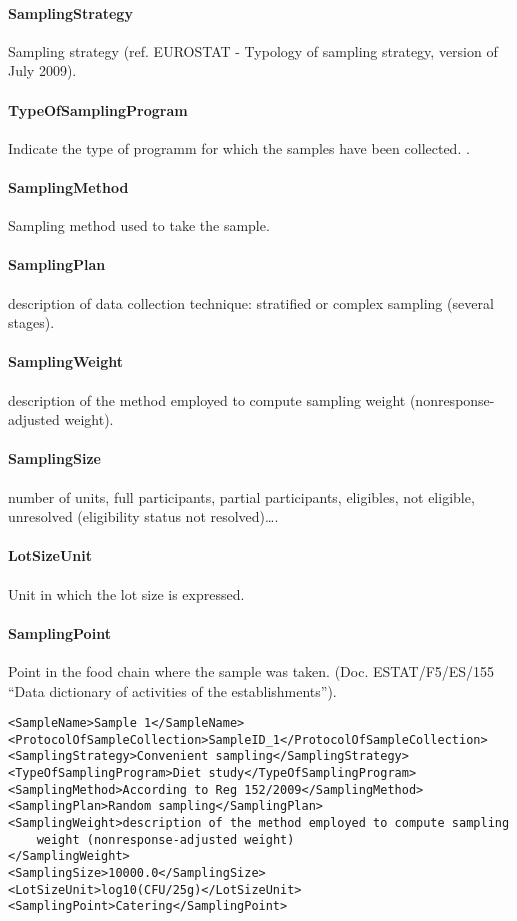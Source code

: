 \documentclass[a4paper]{report}
\begin{document}
\paragraph{SamplingStrategy}
Sampling strategy (ref. EUROSTAT - Typology of sampling strategy, version of July 2009).

\paragraph{TypeOfSamplingProgram}
Indicate the type of programm for which the samples have been collected. .

\paragraph{SamplingMethod}
Sampling method used to take the sample.

\paragraph{SamplingPlan}
description of data collection technique: stratified or complex sampling (several stages).

\paragraph{SamplingWeight}
description of the method employed to compute sampling weight (nonresponse-adjusted weight).

\paragraph{SamplingSize}
number of units, full participants, partial participants, eligibles, not eligible, unresolved (eligibility status not resolved)….

\paragraph{LotSizeUnit}
Unit in which the lot size is expressed.

\paragraph{SamplingPoint}
Point in the food chain where the sample was taken. (Doc. ESTAT/F5/ES/155 ``Data dictionary of activities of the establishments'').

\begin{lstlisting}[language=RAKIP, caption={Example of StudySample}]
<SampleName>Sample 1</SampleName>
<ProtocolOfSampleCollection>SampleID_1</ProtocolOfSampleCollection>
<SamplingStrategy>Convenient sampling</SamplingStrategy>
<TypeOfSamplingProgram>Diet study</TypeOfSamplingProgram>
<SamplingMethod>According to Reg 152/2009</SamplingMethod>
<SamplingPlan>Random sampling</SamplingPlan>
<SamplingWeight>description of the method employed to compute sampling
    weight (nonresponse-adjusted weight)
</SamplingWeight>
<SamplingSize>10000.0</SamplingSize>
<LotSizeUnit>log10(CFU/25g)</LotSizeUnit>
<SamplingPoint>Catering</SamplingPoint>
\end{lstlisting}
\end{document}
